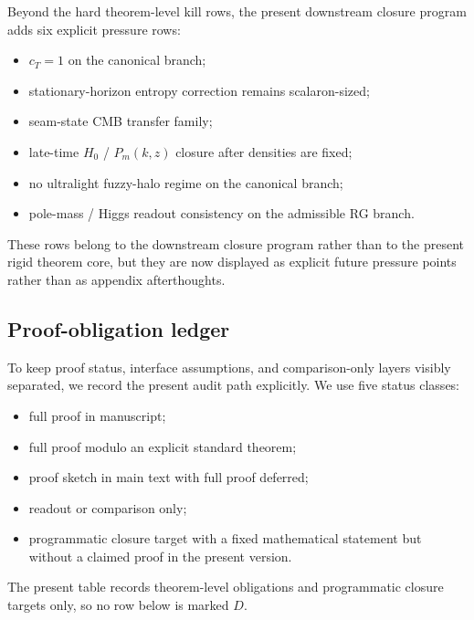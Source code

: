 \documentclass[11pt,a4paper]{article}
\theoremstyle{definition}
\theoremstyle{remark}
\begin{document}
\begin{tcolorbox}[colback=blue!2, colframe=blue!40!black, breakable,
    title={Downstream pressure rows of the present version}, colbacktitle=blue!55!black]
Beyond the hard theorem-level kill rows, the present downstream closure program adds six explicit
pressure rows:
\begin{itemize}[leftmargin=1.5em, topsep=3pt, itemsep=2pt]
    \item $c_T=1$ on the canonical branch;
    \item stationary-horizon entropy correction remains scalaron-sized;
    \item seam-state CMB transfer family;
    \item late-time $H_0$ / $P_m(k,z)$ closure after densities are fixed;
    \item no ultralight fuzzy-halo regime on the canonical branch;
    \item pole-mass / Higgs readout consistency on the admissible RG branch.
\end{itemize}
These rows belong to the downstream closure program rather than to the present rigid theorem core,
but they are now displayed as explicit future pressure points rather than as appendix afterthoughts.
\end{tcolorbox}

\subsection{Proof-obligation ledger}

To keep proof status, interface assumptions, and comparison-only layers visibly separated, we record
the present audit path explicitly. We use five status classes:
\begin{itemize}[leftmargin=1.4em, topsep=2pt, itemsep=1pt]
    \item[$A$] full proof in manuscript;
    \item[$B$] full proof modulo an explicit standard theorem;
    \item[$C$] proof sketch in main text with full proof deferred;
    \item[$D$] readout or comparison only;
    \item[$P$] programmatic closure target with a fixed mathematical statement but without a claimed proof in the present version.
\end{itemize}
The present table records theorem-level obligations and programmatic closure targets only, so no row below is marked $D$.
\end{document}
